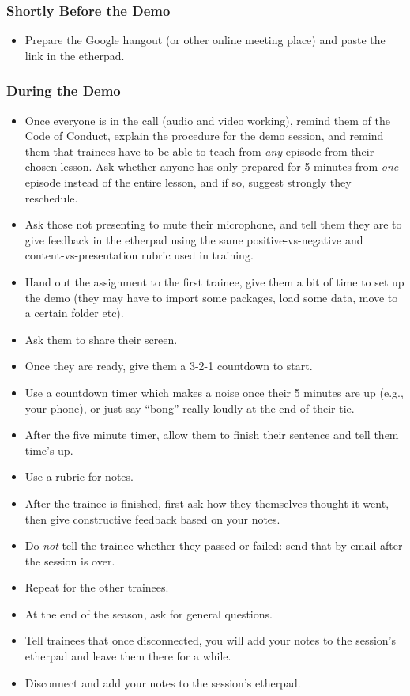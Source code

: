 \subsubsection{Shortly Before the Demo}\label{shortly-before-the-demo}

\begin{itemize}
\item
  Prepare the Google hangout (or other online meeting place) and paste
  the link in the etherpad.
\end{itemize}

\subsubsection{During the Demo}\label{during-the-demo}

\begin{itemize}
\item
  Once everyone is in the call (audio and video working), remind them of
  the Code of Conduct, explain the procedure for the demo session, and
  remind them that trainees have to be able to teach from \emph{any}
  episode from their chosen lesson. Ask whether anyone has only prepared
  for 5 minutes from \emph{one} episode instead of the entire lesson,
  and if so, suggest strongly they reschedule.
\item
  Ask those not presenting to mute their microphone, and tell them they
  are to give feedback in the etherpad using the same
  positive-vs-negative and content-vs-presentation rubric used in
  training.
\item
  Hand out the assignment to the first trainee, give them a bit of time
  to set up the demo (they may have to import some packages, load some
  data, move to a certain folder etc).
\item
  Ask them to share their screen.
\item
  Once they are ready, give them a 3-2-1 countdown to start.
\item
  Use a countdown timer which makes a noise once their 5 minutes are up
  (e.g., your phone), or just say ``bong'' really loudly at the end of
  their tie.
\item
  After the five minute timer, allow them to finish their sentence and
  tell them time's up.
\item
  Use a rubric for notes.
\item
  After the trainee is finished, first ask how they themselves thought
  it went, then give constructive feedback based on your notes.
\item
  Do \emph{not} tell the trainee whether they passed or failed: send
  that by email after the session is over.
\item
  Repeat for the other trainees.
\item
  At the end of the season, ask for general questions.
\item
  Tell trainees that once disconnected, you will add your notes to the
  session's etherpad and leave them there for a while.
\item
  Disconnect and add your notes to the session's etherpad.
\end{itemize}

